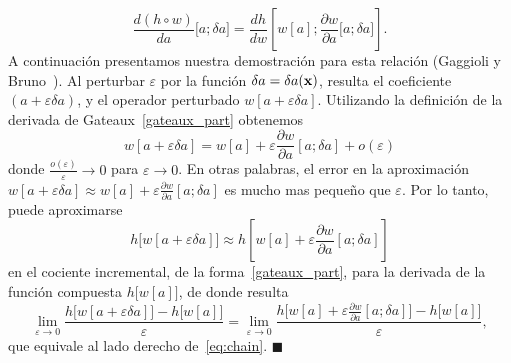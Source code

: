 \begin{equation}\label{eq:chain}
  \frac{d (h\circ w)}{da} \big[a;\delta a\big]= \frac{d h}{
    d w}\left[w[a];\frac{\partial w}{\partial a} \big[a;\delta
    a\big]\right].
\end{equation}
A continuación presentamos nuestra demostración para esta relación (Gaggioli y Bruno~\cite{Gaggioli2022}).  
Al perturbar $\varepsilon$ por la función $\delta a = \delta a(\mathbf{x})$, resulta el coeficiente $(a+\varepsilon\delta a)$, 
y el operador perturbado $w[a+\varepsilon\delta a]$. Utilizando la definición de la derivada 
de Gateaux~\eqref{gateaux_part} obtenemos
\[
  w[a+\varepsilon\delta a] = w[a]+\varepsilon \frac{\partial
    w}{\partial a}[a; \delta a ] + o(\varepsilon)
\]
donde $\frac{o(\varepsilon)}{\varepsilon}\to 0$ para $\varepsilon\to 0$. 
En otras palabras, el error en la aproximación $w[a+\varepsilon\delta a] \approx w[a]+\varepsilon \frac{\partial
  w}{\partial a}[a; \delta a ]$ es mucho mas pequeño que $\varepsilon$. 
Por lo tanto, puede aproximarse   
\[
  h\big[w[a+\varepsilon\delta a]\big] \approx h\left[w[a]+\varepsilon \frac{\partial
    w}{\partial a}[a; \delta a ]\right]
\]
en el cociente incremental, de la forma~\eqref{gateaux_part}, 
para la derivada de la función compuesta $h\big[w[a]\big]$, 
de donde resulta 
\[
 \lim_{\varepsilon\to 0}\frac{h\big[w[a+\varepsilon\delta a]\big]
     -h\big[w[a]\big]}{\varepsilon}  = \lim_{\varepsilon\to
    0} \frac{h\big[w[a]+\varepsilon \frac{\partial w}{\partial a}[a;
    \delta a ]\big]-h\big[w[a]\big]}{\varepsilon},
\]
que equivale al lado derecho de~\eqref{eq:chain}.  $\blacksquare$

